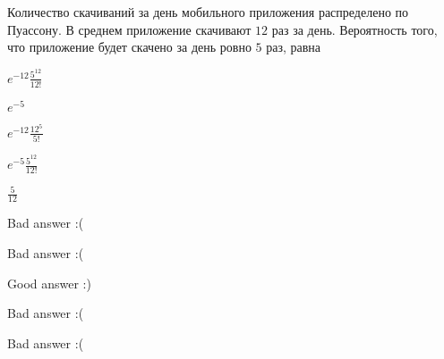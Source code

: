 
\begin{question}
Количество скачиваний за день мобильного приложения распределено по
Пуассону. В среднем приложение скачивают \(12\) раз за день. Вероятность
того, что приложение будет скачено за день ровно \(5\) раз, равна
\begin{answerlist}
  \item \(e^{-12}\frac{5^{12}}{12!}\)
  \item \(e^{-5}\)
  \item \({e}^{-12}\frac{12^5}{5!}\)
  \item \(e^{-5}\frac{5^{12}}{12!}\)
  \item \(\frac{5}{12}\)
\end{answerlist}
\end{question}

\begin{solution}
\begin{answerlist}
  \item Bad answer :(
  \item Bad answer :(
  \item Good answer :)
  \item Bad answer :(
  \item Bad answer :(
\end{answerlist}
\end{solution}

